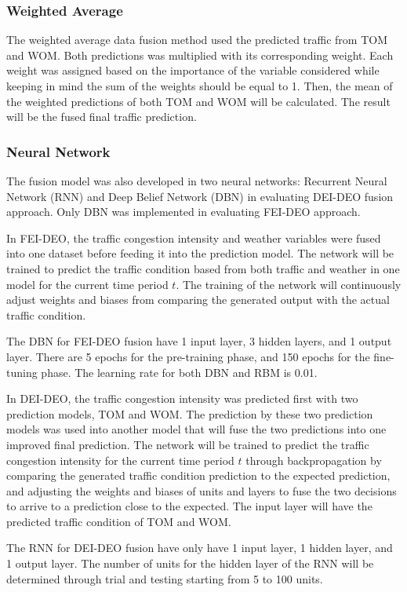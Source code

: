 \subsubsection{Weighted Average}
The weighted average data fusion method used the predicted traffic from TOM and WOM. Both predictions was multiplied with its corresponding weight. Each weight was assigned based on the importance of the variable considered while keeping in mind the sum of the weights should be equal to 1. Then, the mean of the weighted predictions of both TOM and WOM will be calculated. The result will be the fused final traffic prediction.


\subsubsection{Neural Network}
The fusion model was also developed in two neural networks: Recurrent Neural Network (RNN) and Deep Belief Network (DBN) in evaluating DEI-DEO fusion approach. Only DBN was implemented in evaluating FEI-DEO approach.

In FEI-DEO, the traffic congestion intensity and weather variables were fused into one dataset before feeding it into the prediction model. The network will be trained to predict the traffic condition based from both traffic and weather in one model for the current time period $t$. The training of the network will continuously adjust weights and biases from comparing the generated output with the actual traffic condition.

The DBN for FEI-DEO fusion have 1 input layer, 3 hidden layers, and 1 output layer. There are 5 epochs for the pre-training phase, and 150 epochs for the fine-tuning phase. The learning rate for both DBN and RBM is 0.01.

In DEI-DEO, the traffic congestion intensity was predicted first with two prediction models, TOM and WOM. The prediction by these two prediction models was used into another model that will fuse the two predictions into one improved final prediction. The network will be trained to predict the traffic congestion intensity for the current time period $t$ through backpropagation by comparing the generated traffic condition prediction to the expected prediction, and adjusting the weights and biases of units and layers to fuse the two decisions to arrive to a prediction close to the expected. The input layer will have the predicted traffic condition of TOM and WOM.

The RNN for DEI-DEO fusion have only have 1 input layer, 1 hidden layer, and 1 output layer. The number of units for the hidden layer of the RNN will be determined through trial and testing starting from 5 to 100 units.

